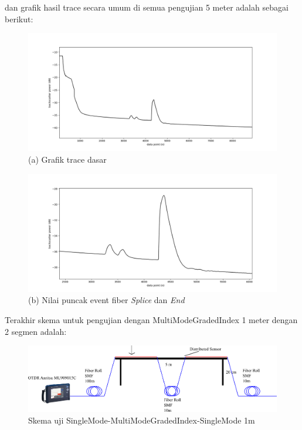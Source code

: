 \documentclass[12pt]{article}
\begin{document}
	dan grafik hasil trace secara umum di semua pengujian 5 meter adalah sebagai berikut:
	
	\begin{figure}[!ht]
		\centering
		\captionsetup{justification=centering}
		\includegraphics[width=\textwidth]{images/Bab_4/Bab_4_5e1}	
		\caption{\small{(a) Grafik trace dasar}}
	\end{figure}
	
	\newpage
	\begin{figure}[!ht]
		\centering
		\captionsetup{justification=centering}
		\includegraphics[width=\textwidth]{images/Bab_4/Bab_4_5e2}	
		\caption{\small{(b) Nilai puncak event fiber \textit{Splice} dan \textit{End}}}
	\end{figure}
	
	\newpage
	Terakhir skema untuk pengujian dengan MultiModeGradedIndex 1 meter dengan 2 segmen adalah:
	
	\begin{figure}[!ht]
		\centering
		\captionsetup{justification=centering}
		\includegraphics[width=0.7\linewidth]{images/Bab_4/uji2_1m}
		\caption[Trace SMF-SMF]{\small{Skema uji SingleMode-MultiModeGradedIndex-SingleMode 1m}}
	\end{figure}
	
\end{document}
